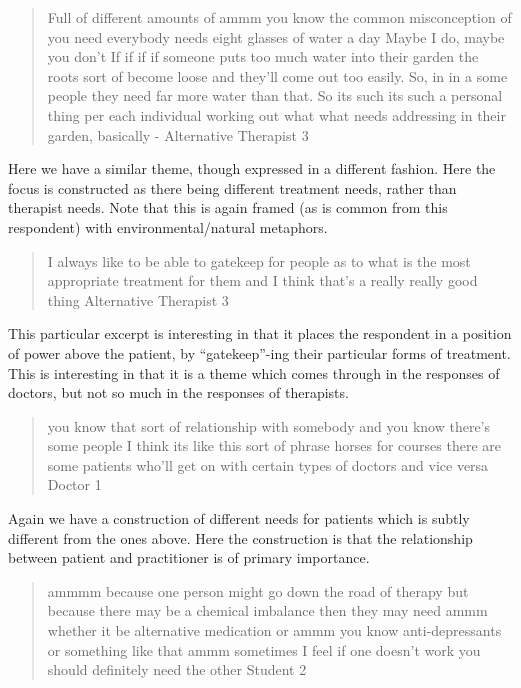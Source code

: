 \begin{quotation}
  Full of different amounts of ammm you know the common misconception of you need everybody needs eight glasses of water a day Maybe I do, maybe you don't If if if if someone puts too much water into their garden the roots sort of become loose and they'll come out too easily. So, in in a some people they need far more water than that. So its such its such a personal thing per each individual working out what what needs addressing in their garden, basically
 - Alternative Therapist 3
\end{quotation}

Here we have a similar theme, though expressed in a different fashion. Here the focus is constructed as there being different treatment needs, rather than therapist needs. Note that this is again framed (as is common from this respondent) with environmental/natural metaphors. 

\begin{quotation}
  I always like to be able to gatekeep for people as to what is the most appropriate treatment for them and I think that's a really really good thing
Alternative Therapist 3
\end{quotation}

This particular excerpt is interesting in that it places the respondent in a position of power above the patient, by ``gatekeep''-ing their particular forms of treatment. This is interesting in that it is a theme which comes through in the responses of doctors, but not so much in the responses of therapists. 

\begin{quotation}
  you know that sort of relationship with somebody and you know there's some people I think its like this sort of phrase horses for courses there are some patients who'll get on with certain types of doctors and vice versa
Doctor 1
\end{quotation}

Again we have a construction of different needs for patients which is subtly different from the ones above. Here the construction is that the relationship between patient and practitioner is of primary importance. 

\begin{quotation}
   ammmm because one person might go down the road of therapy but because there may be a chemical imbalance then they may need ammm whether it be alternative medication or ammm you know anti-depressants or something like that ammm sometimes I feel if one doesn't work you should definitely need the other
Student 2
\end{quotation}

